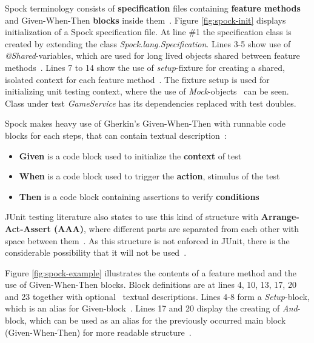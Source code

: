     Spock terminology consists of \textbf{specification} files containing \textbf{feature methods} and Given-When-Then
    \textbf{blocks} inside them~\cite{spock}. Figure \ref{fig:spock-init} displays initialization of a Spock specification
    file. At line \#1 the specification class is created by extending the class \textit{Spock.lang.Specification}. Lines
    3-5 show use of \textit{@Shared}-variables, which are used for long lived objects shared between feature methods~\cite{spock}.
    Lines 7 to 14 show the use of \textit{setup}-fixture for creating a shared, isolated context for each feature method~\cite{spock}.
    The fixture setup is used for initializing unit testing context, where the use of \textit{Mock}-objects~\cite{spock} can be seen.
    Class under test \textit{GameService} has its dependencies replaced with test doubles.

    Spock makes heavy use of Gherkin's Given-When-Then with runnable code blocks for each steps, that can contain textual
    description~\cite{kapelonis2016java}:
    \begin{itemize}
    \item \textbf{Given} is a code block used to initialize the \textbf{context} of test
    \item \textbf{When} is a code block used to trigger the \textbf{action}, stimulus of the test
    \item \textbf{Then} is a code block containing assertions to verify \textbf{conditions}
    \end{itemize}
    JUnit testing literature also states to use this kind of structure with \textbf{Arrange-Act-Assert (AAA)},
    where different parts are separated from each other with space between them~\cite{langr2015pragmatic}.
    As this structure is not enforced in JUnit, there is the considerable possibility that it will not be used~\cite{kapelonis2016java}.

    Figure \ref{fig:spock-example} illustrates the contents of a feature method and the use of Given-When-Then blocks.
    Block definitions are at lines 4, 10, 13, 17, 20 and 23 together
    with optional~\cite{spock} textual descriptions.
    Lines 4-8 form a \textit{Setup}-block, which is an alias for Given-block~\cite{spock}.
    Lines 17 and 20 display the creating of \textit{And}-block, which can be used as
    an alias for the previously occurred main block (Given-When-Then) for more readable structure~\cite{kapelonis2016java}.

